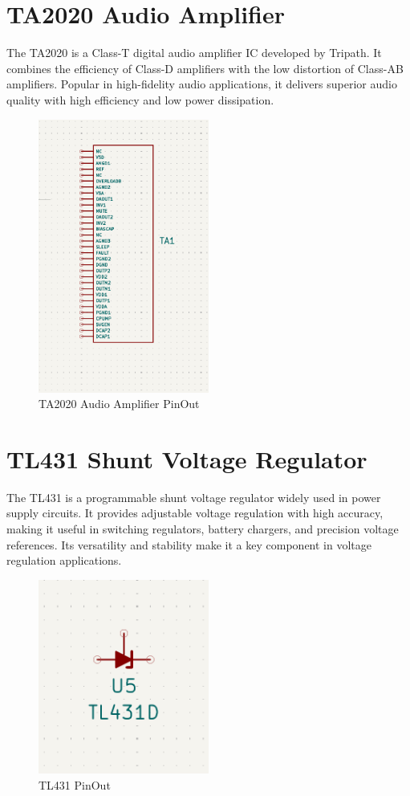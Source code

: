 \documentclass{article}
\begin{document}
\section{TA2020 Audio Amplifier}
The TA2020 is a Class-T digital audio amplifier IC developed by Tripath. It combines the efficiency of Class-D amplifiers with the low distortion of Class-AB amplifiers. Popular in high-fidelity audio applications, it delivers superior audio quality with high efficiency and low power dissipation.
\begin{figure}[H]
    \centering
    \includegraphics[width=0.5\textwidth]{img/TA2020.png}
    \caption{TA2020 Audio Amplifier PinOut}
    \label{fig:TA2020}
\end{figure}

\section{TL431 Shunt Voltage Regulator}
The TL431 is a programmable shunt voltage regulator widely used in power supply circuits. It provides adjustable voltage regulation with high accuracy, making it useful in switching regulators, battery chargers, and precision voltage references. Its versatility and stability make it a key component in voltage regulation applications.
\begin{figure}[H]
    \centering
    \includegraphics[width=0.5\textwidth]{img/TL431.png}
    \caption{TL431 PinOut}
    \label{fig:TL431}
\end{figure}
\end{document}
